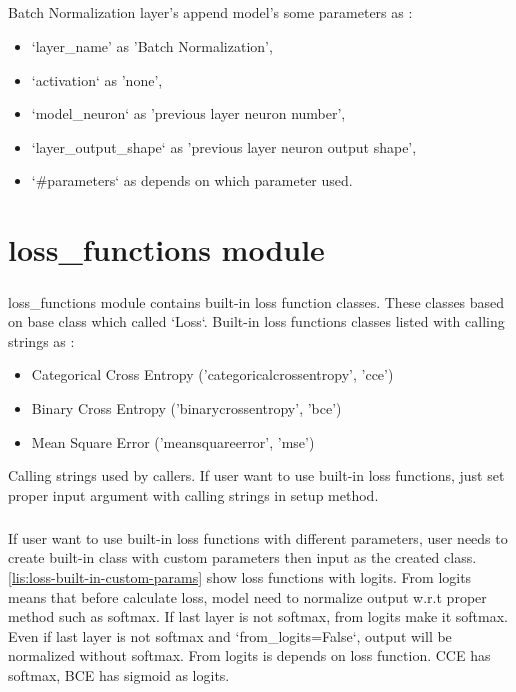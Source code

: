 \documentclass[12pt]{report}
\begin{document}
\paragraph{}
Batch Normalization  layer's append model's some parameters as :

\begin{itemize}
	\item `layer\_name' as 'Batch Normalization',
	\item `activation` as 'none',
	\item `model\_neuron` as 'previous layer neuron number',
	\item `layer\_output\_shape` as 'previous layer neuron output shape',
	\item `\#parameters` as depends on which parameter used.
\end{itemize}





\chapter{loss\_functions module}
\label{ch:loss}

\paragraph{}
loss\_functions module contains built-in loss function classes. These classes based on base class which called `Loss`. Built-in loss functions classes listed with calling strings as : 

\begin{itemize}
	\item Categorical Cross Entropy ('categoricalcrossentropy', 'cce')
	\item Binary Cross Entropy ('binarycrossentropy', 'bce')
	\item Mean Square Error  ('meansquareerror', 'mse')
\end{itemize}

Calling strings used by callers. If user want to use built-in loss functions, just set proper input argument with calling strings in setup method. 

\paragraph{}
If user want to use built-in loss functions with different parameters, user needs to create built-in class with custom parameters then input as the created class. \ref{lis:loss-built-in-custom-params} show loss functions with logits. From logits means that before calculate loss, model need to normalize output w.r.t proper method such as softmax. If last layer is not softmax, from logits make it softmax. Even if last layer is not softmax and `from\_logits=False`, output will be normalized without softmax. From logits is depends on loss function. CCE has softmax, BCE has sigmoid as logits.
\end{document}
